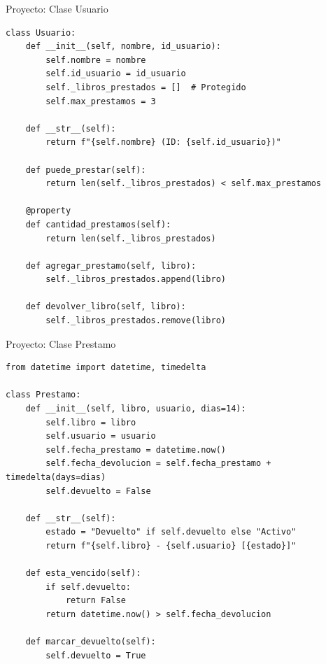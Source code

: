 \documentclass{beamer}
\begin{document}
\begin{frame}[fragile]{Proyecto: Clase Usuario \faUser}
\begin{lstlisting}
class Usuario:
    def __init__(self, nombre, id_usuario):
        self.nombre = nombre
        self.id_usuario = id_usuario
        self._libros_prestados = []  # Protegido
        self.max_prestamos = 3
    
    def __str__(self):
        return f"{self.nombre} (ID: {self.id_usuario})"
    
    def puede_prestar(self):
        return len(self._libros_prestados) < self.max_prestamos
    
    @property
    def cantidad_prestamos(self):
        return len(self._libros_prestados)
    
    def agregar_prestamo(self, libro):
        self._libros_prestados.append(libro)
    
    def devolver_libro(self, libro):
        self._libros_prestados.remove(libro)
\end{lstlisting}
\end{frame}

\begin{frame}[fragile]{Proyecto: Clase Prestamo \faExchangeAlt}
\begin{lstlisting}
from datetime import datetime, timedelta

class Prestamo:
    def __init__(self, libro, usuario, dias=14):
        self.libro = libro
        self.usuario = usuario
        self.fecha_prestamo = datetime.now()
        self.fecha_devolucion = self.fecha_prestamo + timedelta(days=dias)
        self.devuelto = False
    
    def __str__(self):
        estado = "Devuelto" if self.devuelto else "Activo"
        return f"{self.libro} - {self.usuario} [{estado}]"
    
    def esta_vencido(self):
        if self.devuelto:
            return False
        return datetime.now() > self.fecha_devolucion
    
    def marcar_devuelto(self):
        self.devuelto = True
\end{lstlisting}
\end{frame}
\end{document}

